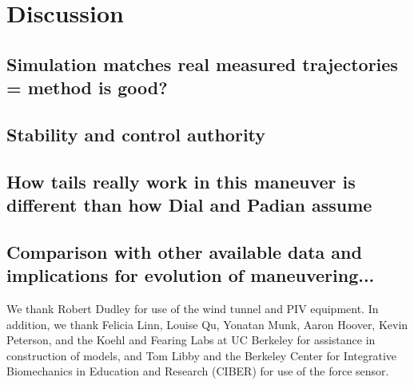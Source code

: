 \documentclass{rspublic}
\begin{document}
\section{Discussion}
\subsection{Simulation matches real measured trajectories = method is good?}
\subsection{Stability and control authority}
\subsection{How tails really work in this maneuver is different than how Dial and Padian assume}
\subsection{Comparison with other available data and implications for evolution of maneuvering...}

\begin{acknowledgements}
We thank Robert Dudley for use of the wind tunnel and PIV equipment.  In addition, we thank Felicia Linn, Louise Qu, Yonatan Munk, Aaron Hoover, Kevin Peterson, and the Koehl and Fearing Labs at UC Berkeley for assistance in construction of models, and Tom Libby and the Berkeley Center for Integrative Biomechanics in Education and Research (CIBER) for use of the force sensor.
\end{acknowledgements}


\label{lastpage}
\end{document}
